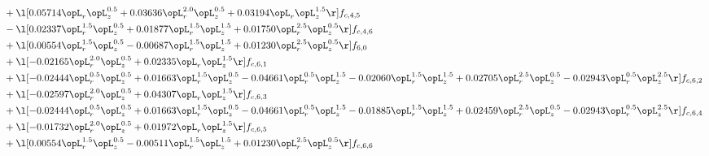 \begin{alignat}{2}
& + \l[  0.05714 \opL_r \opL_z^{0.5} +  0.03636 \opL_r^{2.0} \opL_z^{0.5} +  0.03194 \opL_r \opL_z^{1.5}  \r] f_{c,4,5} \nonumber \\ 
& - \l[  0.02337 \opL_r^{1.5} \opL_z^{0.5} +  0.01877 \opL_r^{1.5} \opL_z^{1.5} +  0.01750 \opL_r^{2.5} \opL_z^{0.5}  \r] f_{c,4,6} \nonumber \\ 
& + \l[  0.00554 \opL_r^{1.5} \opL_z^{0.5}   -0.00687 \opL_r^{1.5} \opL_z^{1.5} +  0.01230 \opL_r^{2.5} \opL_z^{0.5}  \r] f_{6,0} \nonumber \\ 
& + \l[  -0.02165 \opL_r^{2.0} \opL_z^{0.5} +  0.02335 \opL_r \opL_z^{1.5}  \r] f_{c,6,1} \nonumber \\ 
& + \l[  -0.02444 \opL_r^{0.5} \opL_z^{0.5} +  0.01663 \opL_r^{1.5} \opL_z^{0.5}   -0.04661 \opL_r^{0.5} \opL_z^{1.5}   -0.02060 \opL_r^{1.5} \opL_z^{1.5} +  0.02705 \opL_r^{2.5} \opL_z^{0.5}   -0.02943 \opL_r^{0.5} \opL_z^{2.5}  \r] f_{c,6,2} \nonumber \\ 
& + \l[  -0.02597 \opL_r^{2.0} \opL_z^{0.5} +  0.04307 \opL_r \opL_z^{1.5}  \r] f_{c,6,3} \nonumber \\ 
& + \l[  -0.02444 \opL_r^{0.5} \opL_z^{0.5} +  0.01663 \opL_r^{1.5} \opL_z^{0.5}   -0.04661 \opL_r^{0.5} \opL_z^{1.5}   -0.01885 \opL_r^{1.5} \opL_z^{1.5} +  0.02459 \opL_r^{2.5} \opL_z^{0.5}   -0.02943 \opL_r^{0.5} \opL_z^{2.5}  \r] f_{c,6,4} \nonumber \\ 
& + \l[  -0.01732 \opL_r^{2.0} \opL_z^{0.5} +  0.01972 \opL_r \opL_z^{1.5}  \r] f_{c,6,5} \nonumber \\ 
& + \l[  0.00554 \opL_r^{1.5} \opL_z^{0.5}   -0.00511 \opL_r^{1.5} \opL_z^{1.5} +  0.01230 \opL_r^{2.5} \opL_z^{0.5}  \r] f_{c,6,6} \nonumber \\ 
\end{alignat} 



